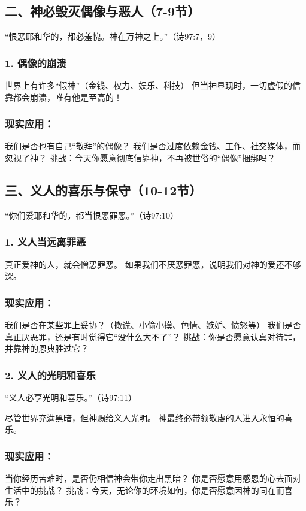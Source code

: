 \documentclass[a4paper, 12pt]{article}
\begin{document}
\subsection*{二、神必毁灭偶像与恶人（7-9节）}
“恨恶耶和华的，都必羞愧。神在万神之上。”（诗97:7，9）

\subsubsection*{1. 偶像的崩溃}
世界上有许多“假神”（金钱、权力、娱乐、科技）
但当神显现时，一切虚假的信靠都会崩溃，唯有他是至高的！
\subsubsection*{现实应用：}

我们是否也有自己“敬拜”的偶像？
我们是否过度依赖金钱、工作、社交媒体，而忽视了神？
挑战：今天你愿意彻底信靠神，不再被世俗的“偶像”捆绑吗？

\subsection*{三、义人的喜乐与保守（10-12节）}
“你们爱耶和华的，都当恨恶罪恶。”（诗97:10）

\subsubsection*{1. 义人当远离罪恶}
真正爱神的人，就会憎恶罪恶。
如果我们不厌恶罪恶，说明我们对神的爱还不够深。
\subsubsection*{现实应用：}

我们是否在某些罪上妥协？（撒谎、小偷小摸、色情、嫉妒、愤怒等）
我们是否真正厌恶罪，还是有时觉得它“没什么大不了”？
挑战：你是否愿意认真对待罪，并靠神的恩典胜过它？

\subsubsection*{2. 义人的光明和喜乐}
“义人必享光明和喜乐。”（诗97:11）

尽管世界充满黑暗，但神赐给义人光明。
神最终必带领敬虔的人进入永恒的喜乐。
\subsubsection*{现实应用：}

当你经历苦难时，是否仍相信神会带你走出黑暗？
你是否愿意用感恩的心去面对生活中的挑战？
挑战：今天，无论你的环境如何，你是否愿意因神的同在而喜乐？
\end{document}
